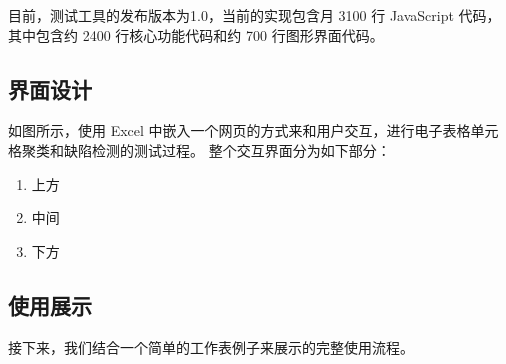 目前，\eg 测试工具的发布版本为1.0，当前的实现包含月 3100 行 JavaScript 代码，其中包含约 2400 行核心功能代码和约 700 行图形界面代码。

\subsection{界面设计}

如图所示，\eg 使用 Excel 中嵌入一个网页的方式来和用户交互，进行电子表格单元格聚类和缺陷检测的测试过程。
整个交互界面分为如下部分：
\begin{enumerate}
    \item 上方 
    \item 中间 
    \item 下方 
\end{enumerate}

\subsection{使用展示}

接下来，我们结合一个简单的工作表例子来展示\eg 的完整使用流程。 